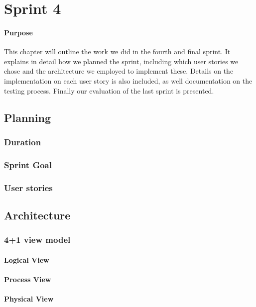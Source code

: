 \chapter{Sprint 4}

\minitoc

\subsubsection{Purpose}

This chapter will outline the work we did in the fourth and final sprint. It explains in detail how we planned the sprint, including which user stories we chose and the architecture we employed to implement these. Details on the implementation on each user story is also included, as well documentation on the testing process. Finally our evaluation of the last sprint is presented.

\clearpage


\section{Planning}
\subsection{Duration}
\subsection{Sprint Goal}
\subsection{User stories}

\section{Architecture}
\subsection{4+1 view model}
\subsubsection{Logical View}
\subsubsection{Process View}
\subsubsection{Physical View}

